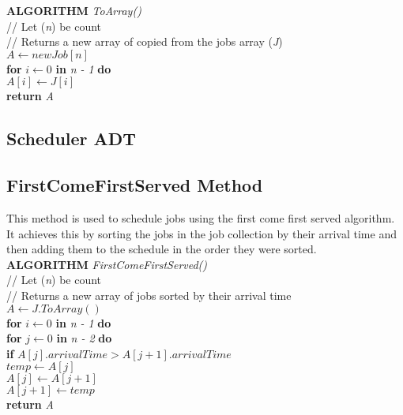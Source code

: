 \documentclass[12pt,a4paper]{article}
\begin{document}
				\textbf{ALGORITHM} \textit{ToArray()}\\
				\null\hspace{1cm}// Let (\textit{n}) be count\\
				\null\hspace{1cm}// Returns a new array of copied from the jobs array (\textit{J})\\
				\null\hspace{1cm}\textit{$A \gets new Job[n]$}\\
				\null\hspace{1cm}\textbf{for} \textit{$i \gets 0$} \textbf{in} \textit{n - 1} \textbf{do}\\
				\null\hspace{2cm}\textit{$A[i] \gets J[i]$}\\
				\null\hspace{1cm}\textbf{return} \textit{A}\\
				
		\subsection{Scheduler ADT}
			\subsection{FirstComeFirstServed Method}
				This method is used to schedule jobs using the first come first served algorithm. It achieves 
				this by sorting the jobs in the job collection by their arrival time and then adding them to 
				the schedule in the order they were sorted.\\

				\textbf{ALGORITHM} \textit{FirstComeFirstServed()}\\
				\null\hspace{1cm}// Let (\textit{n}) be count\\
				\null\hspace{1cm}// Returns a new array of jobs sorted by their arrival time\\
				\null\hspace{1cm}\textit{$A \gets J.ToArray()$}\\
				\null\hspace{1cm}\textbf{for} \textit{$i \gets 0$} \textbf{in} \textit{n - 1} \textbf{do}\\
				\null\hspace{2cm}\textbf{for} \textit{$j \gets 0$} \textbf{in} \textit{n - 2} \textbf{do}\\
				\null\hspace{3cm}\textbf{if} \textit{$A[j].arrivalTime > A[j + 1].arrivalTime$}\\
				\null\hspace{4cm}\textit{$temp \gets A[j]$}\\
				\null\hspace{4cm}\textit{$A[j] \gets A[j + 1]$}\\
				\null\hspace{4cm}\textit{$A[j + 1] \gets temp$}\\
				\null\hspace{1cm}\textbf{return} \textit{A}\\
	
\end{document}
